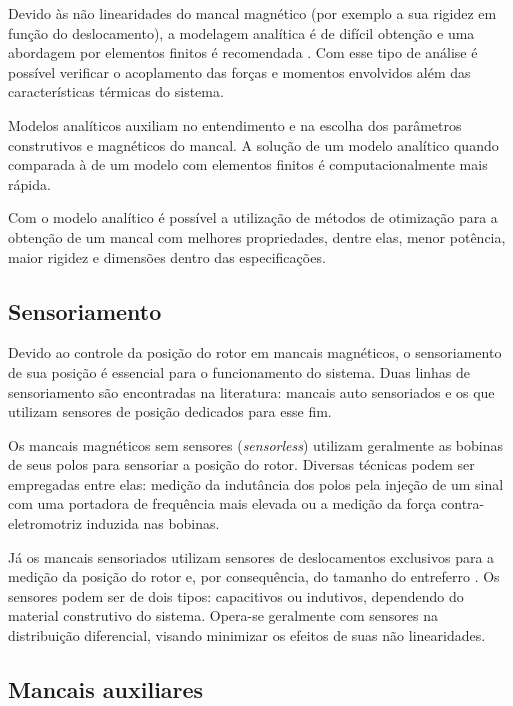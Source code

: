 Devido às não linearidades do mancal magnético (por exemplo a sua rigidez em função do deslocamento), a modelagem analítica é de difícil obtenção e uma abordagem por elementos finitos é recomendada \citep{pilat2007automatic}. Com esse tipo de análise é possível verificar o acoplamento das forças e momentos envolvidos além das características térmicas do sistema.

Modelos analíticos \citep{Tezuka2013, Chiba} auxiliam no entendimento e na escolha dos parâmetros construtivos e magnéticos do mancal. A solução de um modelo analítico quando comparada à de um modelo com elementos finitos é computacionalmente mais rápida.

Com o modelo analítico é possível a utilização de métodos de otimização \citep{Wu2009, Fang2014} para a obtenção de um mancal com melhores propriedades, dentre elas, menor potência, maior rigidez e dimensões dentro das especificações. 

\subsection{Sensoriamento}

Devido ao controle da posição do rotor em mancais magnéticos, o sensoriamento de sua posição é essencial para o funcionamento do sistema. Duas linhas de sensoriamento são encontradas na literatura: mancais auto sensoriados \citep{Vischer1993} e os que utilizam sensores de posição dedicados para esse fim.

Os mancais magnéticos sem sensores (\textit{sensorless}) utilizam geralmente as bobinas de seus polos para sensoriar a posição do rotor. Diversas técnicas podem ser empregadas \citep{Hofer2009a, Mukhopadhyay2005} entre elas: medição da indutância dos polos pela injeção de um sinal com uma portadora de frequência mais elevada ou a medição da força contra-eletromotriz induzida nas bobinas.
 
Já os mancais sensoriados utilizam sensores de deslocamentos exclusivos para a medição da posição do rotor e, por consequência, do tamanho do entreferro \citep{Sivadasan1996}. Os sensores podem ser de dois tipos: capacitivos ou indutivos, dependendo do material construtivo do sistema. Opera-se geralmente com sensores na distribuição diferencial, visando minimizar os efeitos de suas não linearidades.
 
\subsection{Mancais auxiliares}

